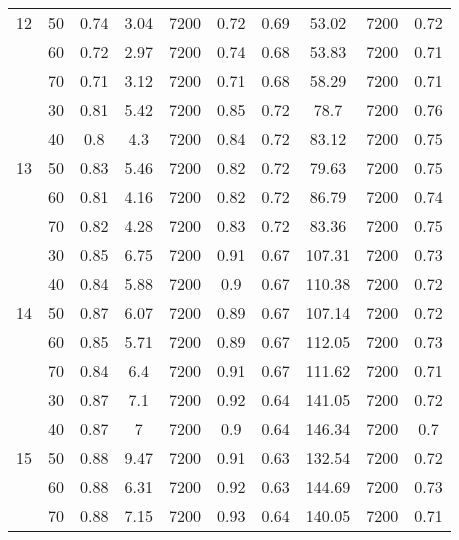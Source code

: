 \documentclass{itor}
\theoremstyle{definition}
\theoremstyle{remark}
\begin{document}
\begin{table}[htbp]
\begin{tabular}{|c|c|cccc|cccc|}
    12    & 50    & 0.74  & 3.04  & 7200  & 0.72  & 0.69  & 53.02 & 7200  & 0.72 \\
          & 60    & 0.72  & 2.97  & 7200  & 0.74  & 0.68  & 53.83 & 7200  & 0.71 \\
          & 70    & 0.71  & 3.12  & 7200  & 0.71  & 0.68  & 58.29 & 7200  & 0.71 \\
    \midrule
          & 30    & 0.81  & 5.42  & 7200  & 0.85  & 0.72  & 78.7  & 7200  & 0.76 \\
          & 40    & 0.8   & 4.3   & 7200  & 0.84  & 0.72  & 83.12 & 7200  & 0.75 \\
    13    & 50    & 0.83  & 5.46  & 7200  & 0.82  & 0.72  & 79.63 & 7200  & 0.75 \\
          & 60    & 0.81  & 4.16  & 7200  & 0.82  & 0.72  & 86.79 & 7200  & 0.74 \\
          & 70    & 0.82  & 4.28  & 7200  & 0.83  & 0.72  & 83.36 & 7200  & 0.75 \\
    \midrule
          & 30    & 0.85  & 6.75  & 7200  & 0.91  & 0.67  & 107.31 & 7200  & 0.73 \\
          & 40    & 0.84  & 5.88  & 7200  & 0.9   & 0.67  & 110.38 & 7200  & 0.72 \\
    14    & 50    & 0.87  & 6.07  & 7200  & 0.89  & 0.67  & 107.14 & 7200  & 0.72 \\
          & 60    & 0.85  & 5.71  & 7200  & 0.89  & 0.67  & 112.05 & 7200  & 0.73 \\
          & 70    & 0.84  & 6.4   & 7200  & 0.91  & 0.67  & 111.62 & 7200  & 0.71 \\
    \midrule
          & 30    & 0.87  & 7.1   & 7200  & 0.92  & 0.64  & 141.05 & 7200  & 0.72 \\
          & 40    & 0.87  & 7     & 7200  & 0.9   & 0.64  & 146.34 & 7200  & 0.7 \\
    15    & 50    & 0.88  & 9.47  & 7200  & 0.91  & 0.63  & 132.54 & 7200  & 0.72 \\
          & 60    & 0.88  & 6.31  & 7200  & 0.92  & 0.63  & 144.69 & 7200  & 0.73 \\
          & 70    & 0.88  & 7.15  & 7200  & 0.93  & 0.64  & 140.05 & 7200  & 0.71 \\
    \bottomrule
    \end{tabular}%
  \label{table:tab2}%
\end{table}%

\end{document}
